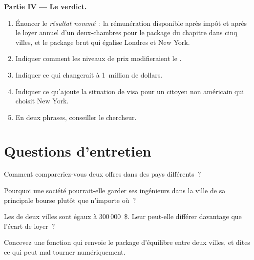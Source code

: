 \begin{problem}
\medskip\noindent\textbf{Partie IV --- Le verdict.}
\begin{enumerate}[resume]
\item Énoncer le \emph{résultat nommé}~: la rémunération disponible après impôt et après le loyer annuel d'un deux-chambres pour le package du chapitre dans
cinq villes, et le package brut qui égalise Londres et New York.
\item Indiquer comment les niveaux de prix modifieraient le .
\item Indiquer ce qui changerait à 1~million de dollars.
\item Indiquer ce qu'ajoute la situation de visa pour un citoyen non américain qui choisit New York.
\item En deux phrases, conseiller le chercheur.
\end{enumerate}
\end{problem}

\section{Questions d'entretien}

\begin{interviewq}\label{iq:in:locations:1}
Comment compareriez-vous deux offres dans des pays différents~?
\end{interviewq}

\begin{interviewq}\label{iq:in:locations:2}
Pourquoi une société pourrait-elle garder ses ingénieurs dans la ville de sa principale bourse plutôt que n'importe où~?
\end{interviewq}

\begin{interviewq}\label{iq:in:locations:3}
Les  de deux villes sont égaux à 300\,000~\$. Leur  peut-elle
différer davantage que l'écart de loyer~?
\end{interviewq}

\begin{interviewq}\label{iq:in:locations:4}
Concevez une fonction qui renvoie le package d'équilibre entre deux villes, et dites ce qui peut mal tourner numériquement.
\end{interviewq}

